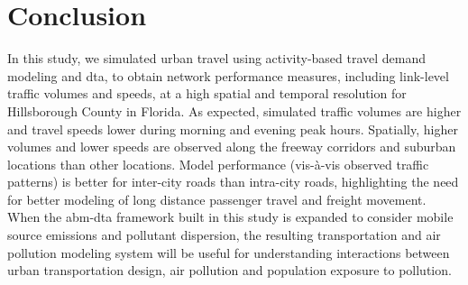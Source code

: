 \section{Conclusion}
In this study, we simulated urban travel using activity-based travel demand modeling and \gls{dta}, to obtain network performance measures, including link-level traffic volumes and speeds, at a high spatial and temporal resolution for Hillsborough County in Florida. 
As expected, simulated traffic volumes are higher and travel speeds lower during morning and evening peak hours. 
Spatially, higher volumes and lower speeds are observed along the freeway corridors and suburban locations than other locations. 
Model performance (vis-à-vis observed traffic patterns) is better for inter-city roads than intra-city roads, highlighting the need for better modeling of long distance passenger travel and freight movement. 
When the \gls{abm}-\gls{dta} framework built in this study is expanded to consider mobile source emissions and pollutant dispersion, the resulting transportation and air pollution modeling system will be useful for understanding interactions between urban transportation design, air pollution and population exposure to pollution.

